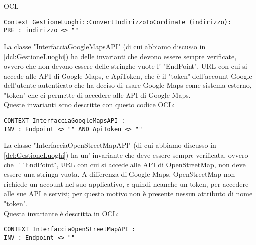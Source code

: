\begin{listaPersonale}{OCL}
    \begin{lstlisting}
Context GestioneLuoghi::ConvertIndirizzoToCordinate (indirizzo):
PRE : indirizzo <> ""
    \end{lstlisting}




    \begin{center}
        
    \end{center}
    La classe "InterfacciaGoogleMapsAPI" (di cui abbiamo discusso in \ref{dcl:GestioneLuoghi}) ha delle invarianti che devono essere sempre verificate, ovvero che non devono essere delle stringhe vuote l' "EndPoint", URL con cui si accede alle API di Google Maps, e ApiToken, che è il "token" dell'account Google dell'utente autenticato che ha deciso di usare Google Maps come sistema esterno, "token" che ci permette di accedere alle API di Google Maps.\\
    Queste invarianti sono descritte con questo codice OCL:
    \begin{lstlisting}
CONTEXT InterfacciaGoogleMapsAPI :
INV : Endpoint <> "" AND ApiToken <> ""
    \end{lstlisting}




    \begin{center}
        
    \end{center}
    La classe "InterfacciaOpenStreetMapAPI" (di cui abbiamo discusso in \ref{dcl:GestioneLuoghi}) ha un' invariante che deve essere sempre verificata, ovvero che l' "EndPoint", URL con cui si accede alle API di OpenStreetMap, non deve essere una stringa vuota. A differenza di Google Maps, OpenStreetMap non richiede un account nel suo applicativo, e quindi neanche un token, per accedere alle sue API e servizi; per questo motivo non è presente nessun attributo di nome "token".\\
    Questa invariante è descritta in OCL:
    \begin{lstlisting}
CONTEXT InterfacciaOpenStreetMapAPI :
INV : Endpoint <> ""
    \end{lstlisting}





\end{listaPersonale}
